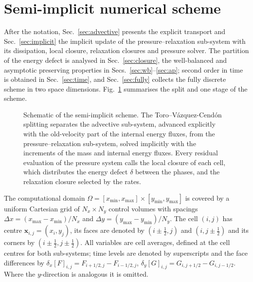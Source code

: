 \section{Semi-implicit numerical scheme}
\label{sec:method}

After the notation, Sec.~\ref{sec:advective} presents the explicit
transport and Sec.~\ref{sec:implicit} the implicit update of the pressure--relaxation sub-system with its
dissipation, local closure, relaxation closures and pressure solver. The partition of the energy defect is analysed in
Sec.~\ref{sec:closure}, the well-balanced and asymptotic preserving properties in Secs.~\ref{sec:wb}--\ref{sec:ap}; second order in time is obtained in Sec.~\ref{sec:time}, and
Sec.~\ref{sec:fully} collects the fully discrete scheme in two space dimensions.
Fig.~\ref{fig:scheme} summarises the split and one stage of the scheme.

\begin{figure}[p]
\centering
\resizebox*{!}{0.84\textheight}{}
\caption{Schematic of the semi-implicit scheme. The Toro--V\'azquez-Cend\'on splitting separates the advective
sub-system, advanced explicitly with the old-velocity part of the internal energy fluxes, from the pressure--relaxation
sub-system, solved implicitly with the increments of the mass and internal energy fluxes. Every residual evaluation of the pressure system calls the local closure of each cell, which
distributes the energy defect $\delta$ between the phases, and the relaxation closure selected by the rates.}
\label{fig:scheme}
\end{figure}

The computational domain $\Omega=[x_{\min},x_{\max}]\times[y_{\min},y_{\max}]$ is covered by a uniform Cartesian grid of
$N_x\times N_y$ control volumes with spacings $\Delta x=(x_{\max}-x_{\min})/N_x$ and $\Delta y=(y_{\max}-y_{\min})/N_y$. The cell $(i,j)$ has
centre $\mathbf x_{i,j}=(x_i,y_j)$, its faces are denoted by $(i\pm\tfrac12,j)$ and $(i,j\pm\tfrac12)$ and its corners by
$(i\pm\tfrac12,j\pm\tfrac12)$. All variables are cell averages, defined at the cell centres for both sub-systems; time levels
are denoted by superscripts and the face differences by $\delta_x[F]_{i,j}=F_{i+1/2,j}-F_{i-1/2,j}$,
$\delta_y[G]_{i,j}=G_{i,j+1/2}-G_{i,j-1/2}$. Where the $y$-direction is analogous it is omitted.


